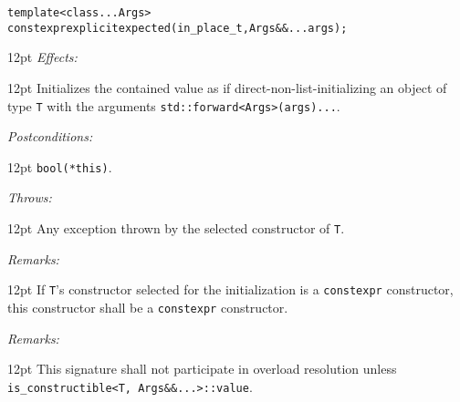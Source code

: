 \documentclass[a4paper,10pt]{article}
\newcommand{\cpp}[1]{\lstinline{#1}}
\newcommand{\wordingItem}[1]{\noindent\textit{#1:}}
\newenvironment{wordingTextItem}[1]{\wordingItem{#1}\vspace{2pt}\noindent\begin{adjustwidth}{12pt}{}}{\vspace{2pt}\end{adjustwidth}}
\newenvironment{wordingPara}{\begin{adjustwidth}{12pt}{}}{\end{adjustwidth}}
\begin{document}
\begin{alltt}
template <class... Args>
constexpr explicit expected(in_place_t, Args&&... args); 
\end{alltt}
\begin{wordingPara}
\begin{wordingTextItem}{Effects}
Initializes the contained value as if direct-non-list-initializing an object of type \cpp{T} with the arguments \cpp{std::forward<Args>(args)...}.
\end{wordingTextItem}
\begin{wordingTextItem}{Postconditions}
\cpp{bool(*this)}.
\end{wordingTextItem}
\begin{wordingTextItem}{Throws}
Any exception thrown by the selected constructor of \cpp{T}.
\end{wordingTextItem}
\begin{wordingTextItem}{Remarks}
If \cpp{T}'s constructor selected for the initialization is a \cpp{constexpr} constructor, this constructor shall be a \cpp{constexpr} constructor.
\end{wordingTextItem}
\begin{wordingTextItem}{Remarks}
This signature shall not participate in overload resolution unless\\
\cpp{is_constructible<T, Args&&...>::value}.
\end{wordingTextItem}
\end{wordingPara}
\end{document}
